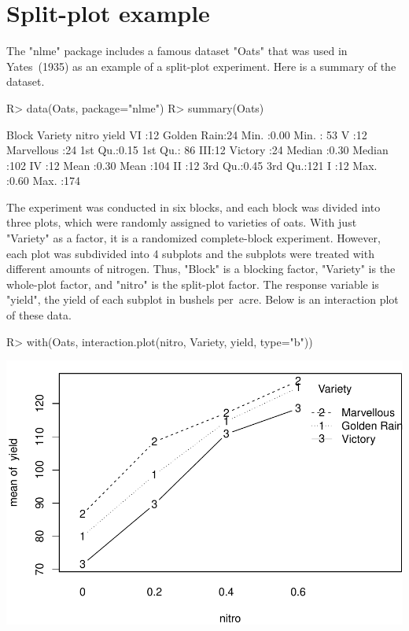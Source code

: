 \documentclass{article}
\begin{document}
\section{Split-plot example}
The "nlme" package includes a famous dataset "Oats" that was used in Yates~(1935) as an example of a split-plot experiment. Here is a summary of the dataset.
\begin{Winput}
R> data(Oats, package="nlme")
R> summary(Oats)
\end{Winput}
\begin{Woutput}
 Block           Variety       nitro          yield
 VI :12   Golden Rain:24   Min.   :0.00   Min.   : 53
 V  :12   Marvellous :24   1st Qu.:0.15   1st Qu.: 86
 III:12   Victory    :24   Median :0.30   Median :102
 IV :12                    Mean   :0.30   Mean   :104
 II :12                    3rd Qu.:0.45   3rd Qu.:121
 I  :12                    Max.   :0.60   Max.   :174
\end{Woutput}
The experiment was conducted in six blocks, and each block was divided into three plots, which were randomly assigned to varieties of oats. With just "Variety" as a factor, it is a randomized complete-block experiment. However, each plot was subdivided into 4 subplots and the subplots were treated with different amounts of nitrogen. Thus, "Block" is a blocking factor, "Variety" is the whole-plot factor, and "nitro" is the split-plot factor. The response variable is "yield", the yield of each subplot in bushels per~acre. Below is an interaction plot of these data.
\begin{Winput}
R> with(Oats, interaction.plot(nitro, Variety, yield, type="b"))
\end{Winput}
\includegraphics[scale=.5]{using-lsmeans-oats-intplot-fig.pdf}
\end{document}
